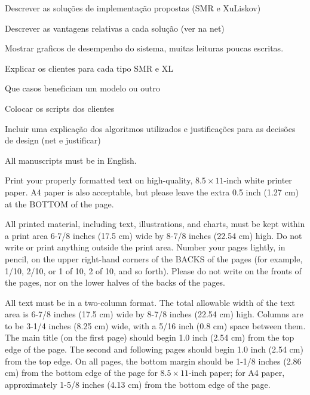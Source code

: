 \documentclass[times, 10pt,two column]{article}
\begin{document}

Descrever as solu\c{c}\~oes de implementa\c{c}\~ao propostas (SMR e XuLiskov)

Descrever as vantagens relativas a cada solu\c{c}\~ao (ver na net)

Mostrar graficos de desempenho do sistema, muitas leituras poucas escritas.

Explicar os clientes para cada tipo SMR e XL

Que casos beneficiam um modelo ou outro

Colocar os scripts dos clientes

Incluir uma explica\c{c}\~ao dos algoritmos utilizados e justifica\c{c}\~oes para as decis\~oes de design (net e justificar)



All manuscripts must be in English.


Print your properly formatted text on high-quality, $8.5 \times 11$-inch 
white printer paper. A4 paper is also acceptable, but please leave the 
extra 0.5 inch (1.27 cm) at the BOTTOM of the page.


All printed material, including text, illustrations, and charts, must be 
kept within a print area 6-7/8 inches (17.5 cm) wide by 8-7/8 inches 
(22.54 cm) high. Do not write or print anything outside the print area. 
Number your pages lightly, in pencil, on the upper right-hand corners of 
the BACKS of the pages (for example, 1/10, 2/10, or 1 of 10, 2 of 10, and 
so forth). Please do not write on the fronts of the pages, nor on the 
lower halves of the backs of the pages.



All text must be in a two-column format. The total allowable width of 
the text area is 6-7/8 inches (17.5 cm) wide by 8-7/8 inches (22.54 cm) 
high. Columns are to be 3-1/4 inches (8.25 cm) wide, with a 5/16 inch 
(0.8 cm) space between them. The main title (on the first page) should 
begin 1.0 inch (2.54 cm) from the top edge of the page. The second and 
following pages should begin 1.0 inch (2.54 cm) from the top edge. On 
all pages, the bottom margin should be 1-1/8 inches (2.86 cm) from the 
bottom edge of the page for $8.5 \times 11$-inch paper; for A4 paper, 
approximately 1-5/8 inches (4.13 cm) from the bottom edge of the page.
\end{document}
